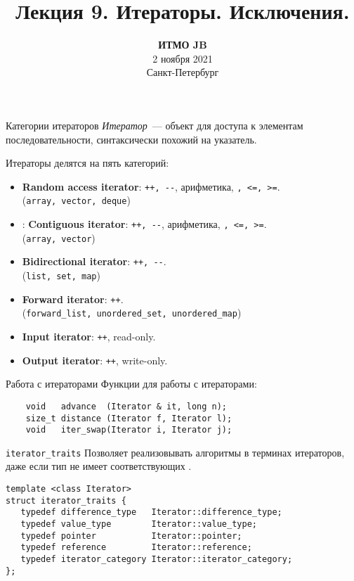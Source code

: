\documentclass{beamer}
\title{Лекция 9. Итераторы. Исключения.}
\date{
   \textbf{ИТМО JB}\\
   2 ноября 2021 \\
   Санкт-Петербург
}
\begin{document}
\begin{frame} 
  \titlepage
\end{frame}

\begin{frame}[fragile]{Категории итераторов}
\small
    \emph{Итератор}~— объект для доступа к элементам
    последовательности, синтаксически похожий на указатель.

    Итераторы делятся на пять категорий: 
    \begin{itemize}
        \item {\bf Random access iterator}: {\tt ++, \verb!--!}, арифметика, {\tt <, >, <=, >=}.\\
        (\texttt{array, vector, deque})
        
        \item \langcpp[20]: {\bf Contiguous iterator}: {\tt ++, \verb!--!}, арифметика, {\tt <, >, <=, >=}. \\
        (\texttt{array, vector})

        \item {\bf Bidirectional iterator}: {\tt ++, \verb!--!}.\\
        (\texttt{list, set, map})

        \item {\bf Forward iterator}: {\tt ++}.\\
        (\texttt{forward\_list, unordered\_set, unordered\_map})

        \item {\bf Input iterator}: {\tt ++}, read-only.

        \item {\bf Output iterator}: {\tt ++}, write-only.
    \end{itemize}
\end{frame}

\begin{frame}[fragile]{Работа с итераторами}
    Функции для работы с итераторами:
\begin{lstlisting}
    void   advance  (Iterator & it, long n);
    size_t distance (Iterator f, Iterator l);
    void   iter_swap(Iterator i, Iterator j);
\end{lstlisting}
\end{frame}

\begin{frame}[fragile]{{\tt iterator\_traits}}
    Позволяет реализовывать алгоритмы в терминах итераторов, даже если тип не имеет соответствующих .
\begin{lstlisting}
template <class Iterator>
struct iterator_traits {
   typedef difference_type   Iterator::difference_type;
   typedef value_type        Iterator::value_type;
   typedef pointer           Iterator::pointer;
   typedef reference         Iterator::reference;
   typedef iterator_category Iterator::iterator_category;
};
\end{lstlisting}
\end{frame}
\end{document}
